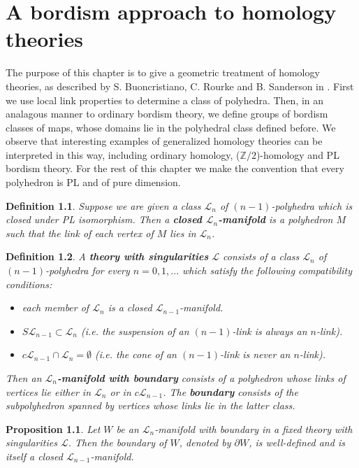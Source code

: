 \documentclass[11pt]{book}
\newtheorem{prop}{Proposition}
\newtheorem{definition}{Definition}
\begin{document}
\chapter{A bordism approach to homology theories}
The purpose of this chapter is to give a geometric treatment of homology theories, as described by S. Buoncristiano, C. Rourke and B. Sanderson in \cite{BRS}. First we use local link properties to determine a class of polyhedra. Then, in an analagous manner to ordinary bordism theory, we define groups of bordism classes of maps, whose domains lie in the polyhedral class defined before. We observe that interesting examples of generalized homology theories can be interpreted in this way, including ordinary homology, ($\mathbb{Z}/2$)-homology and PL bordism theory. \newline
For the rest of this chapter we make the convention that every polyhedron is PL and of pure dimension.

\begin{definition}
Suppose we are given a class $\mathcal{L}_n$ of $(n-1)$-polyhedra which is closed under PL isomorphism. Then a \textbf{closed $\mathcal{L}_n$-manifold} is a polyhedron $M$ such that the link of each vertex of $M$ lies in $\mathcal{L}_n$. 
\end{definition}

\begin{definition}\label{theory}
A \textbf{theory with singularities} $\mathcal{L}$ consists of a class $\mathcal{L}_n$ of $(n-1)$-polyhedra for every $n=0,1,...$ which satisfy the following compatibility conditions:
\begin{itemize}
\item[1.] each member of $\mathcal{L}_n$ is a closed $\mathcal{L}_{n-1}$-manifold.
\item[2.] $S \mathcal{L}_{n-1} \subset \mathcal{L}_n$ (i.e. the suspension of an $(n-1)$-link is always an $n$-link).
\item[3.] $c \mathcal{L}_{n-1} \cap \mathcal{L}_n = \emptyset$ (i.e. the cone of an $(n-1)$-link is never an $n$-link).
\end{itemize}
Then an \textbf{$\mathcal{L}_n$-manifold with boundary} consists of a polyhedron whose links of vertices lie either in $\mathcal{L}_n$ or in $c \mathcal{L}_{n-1}$. The \textbf{boundary} consists of the subpolyhedron spanned by vertices whose links lie in the latter class.
\end{definition}

\begin{prop}
Let $W$ be an $\mathcal{L}_n$-manifold with boundary in a fixed theory with singularities $\mathcal{L}$. Then the boundary of $W$, denoted by $\partial W$, is well-defined and is itself a closed $\mathcal{L}_{n-1}$-manifold.
\end{prop}
\end{document}
